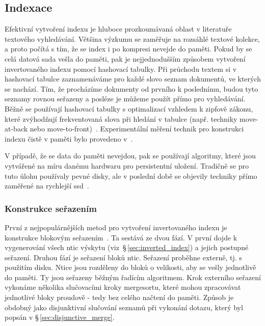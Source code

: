 \documentclass[11pt,letterpaper,oneside,openright]{book}
\begin{document}
\subsection{Indexace}
Efektivní vytvoření indexu je hluboce prozkoumávaná oblast v literatuře
textového vyhledávání. Většina výzkumu se zaměřuje na rozsáhlé textové kolekce,
a proto počítá s tím, že se index i po kompresi nevejde do paměti. Pokud by se
celá datová sada vešla do paměti, pak je nejjednodušším způsobem vytvoření
invertovaného indexu pomocí hashovací tabulky. Při průchodu textem si v
hashovací tabulce zaznamenáváme pro každé slovo seznam dokumentů, ve kterých se
nachází. Tím, že procházíme dokumenty od prvního k poslednímu, budou tyto
seznamy rovnou seřazeny a posléze je můžeme použít přímo pro vyhledávání. Běžně
se používají hashovací tabulky s optimalizací vzhledem k zipfově zákonu, které
zvýhodňují frekventovaná slova při hledání v tabulce (např. techniky
move-at-back nebo move-to-front)~\cite{ZOBEL2001271}. Experimentální měření
technik pro konstrukci indexu čistě v paměti bylo provedeno
v~\cite{Buttcher05memorymanagement}.

V případě, že se data do paměti nevejdou, pak se používají algoritmy, které
jsou vytvářené na míru danému hardwaru pro persistentní uložení. Tradičně se
pro tuto úlohu používaly pevné disky, ale v poslední době se objevily techniky
přímo zaměřené na rychlejší ssd~\cite{Jung201525}.

\subsubsection{Konstrukce seřazením}
První z nejpopulárnějších metod pro vytvoření invertovaného indexu je
konstrukce blokovým seřazením~\citep[kap.~3]{Manning:2008:IIR:1394399}. Ta
sestává ze dvou fází.  V první dojde k vygenerování všech ntic výskytu
(viz~\S\,\ref{sec:inverted_index}) a jejich postupné seřazení. Druhou fází je
seřazení bloků ntic. Seřazení proběhne externě, tj. s použitím disku. Ntice
jsou rozděleny do bloků o velikosti, aby se vešly jednotlivě do paměti. Ty jsou
seřazeny běžným řadícím algoritmem. Krok externího seřazení vykonáme několika
slučovacími kroky mergesortu, které mohou zpracovávat jednotlivé bloky proudově
- tedy bez celého načtení do paměti.  Způsob je obdobný jako disjunktivní
slučování seznamů při vykonání dotazu, který byl popsán v
\S\,\ref{sec:disjunctive_merge}.
\end{document}

